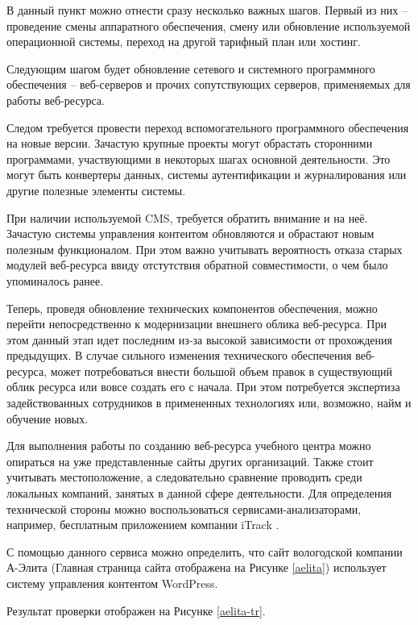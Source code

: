 В данный пункт можно отнести сразу несколько важных шагов.
Первый из них -- проведение смены аппаратного обеспечения, смену или обновление используемой операционной системы, переход на другой тарифный план или хостинг.

Следующим шагом будет обновление сетевого и системного программного обеспечения -- веб-серверов и прочих сопутствующих серверов, применяемых для работы веб-ресурса.

Следом требуется провести переход вспомогательного программного обеспечения на новые версии.
Зачастую крупные проекты могут обрастать сторонними программами, участвующими в некоторых шагах основной деятельности.
Это могут быть конвертеры данных, системы аутентификации и журналирования или другие полезные элементы системы.

При наличии используемой CMS, требуется обратить внимание и на неё.
Зачастую системы управления контентом обновляются и обрастают новым полезным функционалом.
При этом важно учитывать вероятность отказа старых модулей веб-ресурса ввиду отстутствия обратной совместимости, о чем было упоминалось ранее.

Теперь, проведя обновление технических компонентов обеспечения, можно перейти непосредственно к модернизации внешнего облика веб-ресурса.
При этом данный этап идет последним из-за высокой зависимости от прохождения предыдущих.
В случае сильного изменения технического обеспечения веб-ресурса, может потребоваться внести большой объем правок в существующий облик ресурса или вовсе создать его с начала.
При этом потребуется экспертиза задействованных сотрудников в примененных технологиях или, возможно, найм и обучение новых.

Для выполнения работы по созданию веб-ресурса учебного центра можно опираться на уже представленные сайты других организаций.
Также стоит учитывать местоположение, а следовательно сравнение проводить среди локальных компаний, занятых в данной сфере деятельности.
Для определения технической стороны можно воспользоваться сервисами-анализаторами, например, бесплатным приложением компании iTrack \cite{iTrack}.

С помощью данного сервиса можно определить, что сайт вологодской компании А-Элита \cite{aelita} (Главная страница сайта отображена на Рисунке \ref{aelita}) использует систему управления контентом WordPress.


Результат проверки отображен на Рисунке \ref{aelita-tr}.


